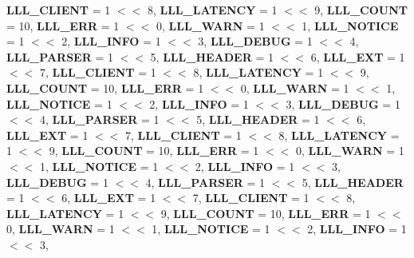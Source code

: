 \begin{DoxyCompactItemize}
\newline
{\bfseries L\+L\+L\+\_\+\+C\+L\+I\+E\+NT} = 1 $<$$<$ 8, 
{\bfseries L\+L\+L\+\_\+\+L\+A\+T\+E\+N\+CY} = 1 $<$$<$ 9, 
{\bfseries L\+L\+L\+\_\+\+C\+O\+U\+NT} = 10, 
{\bfseries L\+L\+L\+\_\+\+E\+RR} = 1 $<$$<$ 0, 
\newline
{\bfseries L\+L\+L\+\_\+\+W\+A\+RN} = 1 $<$$<$ 1, 
{\bfseries L\+L\+L\+\_\+\+N\+O\+T\+I\+CE} = 1 $<$$<$ 2, 
{\bfseries L\+L\+L\+\_\+\+I\+N\+FO} = 1 $<$$<$ 3, 
{\bfseries L\+L\+L\+\_\+\+D\+E\+B\+UG} = 1 $<$$<$ 4, 
\newline
{\bfseries L\+L\+L\+\_\+\+P\+A\+R\+S\+ER} = 1 $<$$<$ 5, 
{\bfseries L\+L\+L\+\_\+\+H\+E\+A\+D\+ER} = 1 $<$$<$ 6, 
{\bfseries L\+L\+L\+\_\+\+E\+XT} = 1 $<$$<$ 7, 
{\bfseries L\+L\+L\+\_\+\+C\+L\+I\+E\+NT} = 1 $<$$<$ 8, 
\newline
{\bfseries L\+L\+L\+\_\+\+L\+A\+T\+E\+N\+CY} = 1 $<$$<$ 9, 
{\bfseries L\+L\+L\+\_\+\+C\+O\+U\+NT} = 10, 
{\bfseries L\+L\+L\+\_\+\+E\+RR} = 1 $<$$<$ 0, 
{\bfseries L\+L\+L\+\_\+\+W\+A\+RN} = 1 $<$$<$ 1, 
\newline
{\bfseries L\+L\+L\+\_\+\+N\+O\+T\+I\+CE} = 1 $<$$<$ 2, 
{\bfseries L\+L\+L\+\_\+\+I\+N\+FO} = 1 $<$$<$ 3, 
{\bfseries L\+L\+L\+\_\+\+D\+E\+B\+UG} = 1 $<$$<$ 4, 
{\bfseries L\+L\+L\+\_\+\+P\+A\+R\+S\+ER} = 1 $<$$<$ 5, 
\newline
{\bfseries L\+L\+L\+\_\+\+H\+E\+A\+D\+ER} = 1 $<$$<$ 6, 
{\bfseries L\+L\+L\+\_\+\+E\+XT} = 1 $<$$<$ 7, 
{\bfseries L\+L\+L\+\_\+\+C\+L\+I\+E\+NT} = 1 $<$$<$ 8, 
{\bfseries L\+L\+L\+\_\+\+L\+A\+T\+E\+N\+CY} = 1 $<$$<$ 9, 
\newline
{\bfseries L\+L\+L\+\_\+\+C\+O\+U\+NT} = 10, 
{\bfseries L\+L\+L\+\_\+\+E\+RR} = 1 $<$$<$ 0, 
{\bfseries L\+L\+L\+\_\+\+W\+A\+RN} = 1 $<$$<$ 1, 
{\bfseries L\+L\+L\+\_\+\+N\+O\+T\+I\+CE} = 1 $<$$<$ 2, 
\newline
{\bfseries L\+L\+L\+\_\+\+I\+N\+FO} = 1 $<$$<$ 3, 
{\bfseries L\+L\+L\+\_\+\+D\+E\+B\+UG} = 1 $<$$<$ 4, 
{\bfseries L\+L\+L\+\_\+\+P\+A\+R\+S\+ER} = 1 $<$$<$ 5, 
{\bfseries L\+L\+L\+\_\+\+H\+E\+A\+D\+ER} = 1 $<$$<$ 6, 
\newline
{\bfseries L\+L\+L\+\_\+\+E\+XT} = 1 $<$$<$ 7, 
{\bfseries L\+L\+L\+\_\+\+C\+L\+I\+E\+NT} = 1 $<$$<$ 8, 
{\bfseries L\+L\+L\+\_\+\+L\+A\+T\+E\+N\+CY} = 1 $<$$<$ 9, 
{\bfseries L\+L\+L\+\_\+\+C\+O\+U\+NT} = 10, 
\newline
{\bfseries L\+L\+L\+\_\+\+E\+RR} = 1 $<$$<$ 0, 
{\bfseries L\+L\+L\+\_\+\+W\+A\+RN} = 1 $<$$<$ 1, 
{\bfseries L\+L\+L\+\_\+\+N\+O\+T\+I\+CE} = 1 $<$$<$ 2, 
{\bfseries L\+L\+L\+\_\+\+I\+N\+FO} = 1 $<$$<$ 3, 

\end{DoxyCompactItemize}
